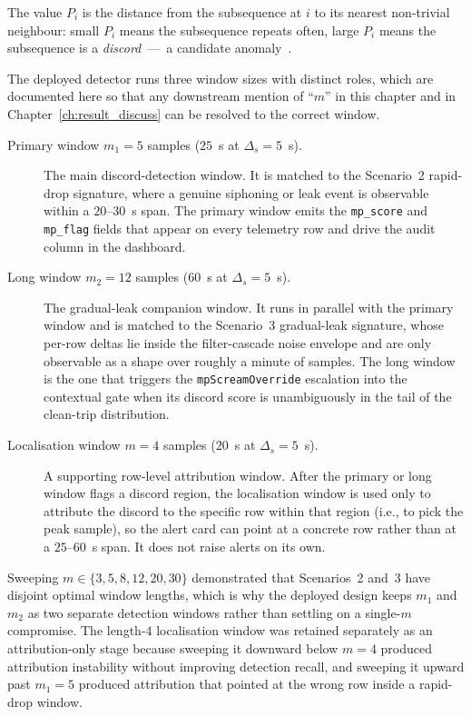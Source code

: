 \vspace{0.5em}
The value $P_i$ is the distance from the subsequence at $i$ to its nearest non-trivial neighbour: small $P_i$ means the subsequence repeats often, large $P_i$ means the subsequence is a \emph{discord}~---~a candidate anomaly~\cite{yeh2016matrix_profile}.

The deployed detector runs three window sizes with distinct roles, which are documented here so that any downstream mention of ``$m$'' in this chapter and in Chapter~\ref{ch:result_discuss} can be resolved to the correct window.

\begin{description}
\item[Primary window $m_1 = 5$ samples ($25$~s at $\Delta_s = 5$~s).] The main discord-detection window. It is matched to the Scenario~2 rapid-drop signature, where a genuine siphoning or leak event is observable within a $20$--$30$~s span. The primary window emits the \texttt{mp\_score} and \texttt{mp\_flag} fields that appear on every telemetry row and drive the audit column in the dashboard.
\item[Long window $m_2 = 12$ samples ($60$~s at $\Delta_s = 5$~s).] The gradual-leak companion window. It runs in parallel with the primary window and is matched to the Scenario~3 gradual-leak signature, whose per-row deltas lie inside the filter-cascade noise envelope and are only observable as a shape over roughly a minute of samples. The long window is the one that triggers the \texttt{mpScreamOverride} escalation into the contextual gate when its discord score is unambiguously in the tail of the clean-trip distribution.
\item[Localisation window $m = 4$ samples ($20$~s at $\Delta_s = 5$~s).] A supporting row-level attribution window. After the primary or long window flags a discord region, the localisation window is used only to attribute the discord to the specific row within that region (i.e., to pick the peak sample), so the alert card can point at a concrete row rather than at a $25$--$60$~s span. It does not raise alerts on its own.
\end{description}

Sweeping $m \in \{3, 5, 8, 12, 20, 30\}$ demonstrated that Scenarios~2 and~3 have disjoint optimal window lengths, which is why the deployed design keeps $m_1$ and $m_2$ as two separate detection windows rather than settling on a single-$m$ compromise. The length-$4$ localisation window was retained separately as an attribution-only stage because sweeping it downward below $m = 4$ produced attribution instability without improving detection recall, and sweeping it upward past $m_1 = 5$ produced attribution that pointed at the wrong row inside a rapid-drop window.

